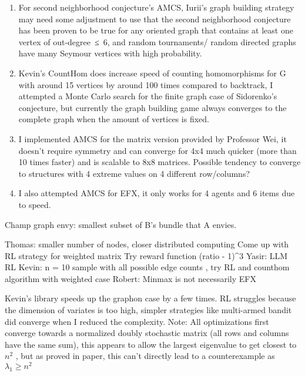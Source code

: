 \documentclass[
  letterpaper,
  DIV=11,
  numbers=noendperiod]{scrartcl}
\begin{document}
\begin{enumerate}
\def\labelenumi{\arabic{enumi}.}
\item
  For second neighborhood conjecture's AMCS, Iurii's graph building
  strategy may need some adjustment to use that the second neighborhood
  conjecture has been proven to be true for any oriented graph that
  contains at least one vertex of out-degree~≤~6, and random
  tournaments/ random directed graphs have many Seymour vertices with
  high probability.
\item
  Kevin's CountHom does increase speed of counting homomorphisms for G
  with around 15 vertices by around 100 times compared to backtrack, I
  attempted a Monte Carlo search for the finite graph case of
  Sidorenko's conjecture, but currently the graph building game always
  converges to the complete graph when the amount of vertices is fixed.
\item
  I implemented AMCS for the matrix version provided by Professor Wei,
  it doesn't require symmetry and can converge for 4x4 much quicker
  (more than 10 times faster) and is scalable to 8x8 matrices. Possible
  tendency to converge to structures with 4 extreme values on 4
  different row/columns?
\item
  I also attempted AMCS for EFX, it only works for 4 agents and 6 items
  due to speed.
\end{enumerate}

Champ graph envy: smallest subset of B's bundle that A envies.

Thomas: smaller number of nodes, closer distributed computing Come up
with RL strategy for weighted matrix Try reward function (ratio -
1)\^{}3 Yasir: LLM RL Kevin: n = 10 sample with all possible edge counts
, try RL and counthom algorithm with weighted case Robert: Minmax is not
necessarily EFX

Kevin's library speeds up the graphon case by a few times. RL struggles
because the dimension of variates is too high, simpler strategies like
multi-armed bandit did converge when I reduced the complexity. Note: All
optimizations first converge towards a normalized doubly stochastic
matrix (all rows and columns have the same sum), this appears to allow
the largest eigenvalue to get closest to \(n^2\) , but as proved in
paper, this can't directly lead to a counterexample as
\(\lambda_1 \geq n^2\)
\end{document}

